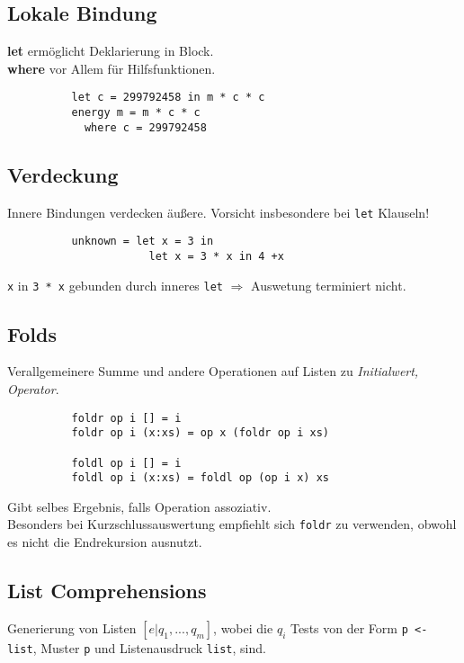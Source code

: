\documentclass[10pt,a4paper,draft]{article}
\def\code#1{\texttt{#1}}
\begin{document}
        \subsection{Lokale Bindung}
        \textbf{let} ermöglicht Deklarierung in Block.\\
        \textbf{where} vor Allem für Hilfsfunktionen.\\
        \begin{lstlisting}
          let c = 299792458 in m * c * c
          energy m = m * c * c
            where c = 299792458
        \end{lstlisting}

        \subsection{Verdeckung}
        Innere Bindungen verdecken äußere.
        Vorsicht insbesondere bei \code{let} Klauseln!
        \begin{lstlisting}
          unknown = let x = 3 in
                      let x = 3 * x in 4 +x
        \end{lstlisting}
        \code{x} in \code{3 * x} gebunden durch inneres \code{let}
        \(\Rightarrow\) Auswetung terminiert nicht.

        \subsection{Folds}
        Verallgemeinere Summe und andere Operationen auf Listen zu \textit{Initialwert, Operator}.
        \begin{lstlisting}
          foldr op i [] = i
          foldr op i (x:xs) = op x (foldr op i xs)

          foldl op i [] = i
          foldl op i (x:xs) = foldl op (op i x) xs
        \end{lstlisting}
        Gibt selbes Ergebnis, falls Operation assoziativ.\\
        Besonders bei Kurzschlussauswertung empfiehlt sich \code{foldr} zu verwenden, obwohl es nicht die Endrekursion ausnutzt.

        \subsection{List Comprehensions}
        Generierung von Listen \code{\([e | q_1, ..., q_m]\)}, wobei die \code{\(q_i\)} Tests von der Form
        \code{p <- list}, Muster \code{p} und Listenausdruck \code{list}, sind.
\end{document}
